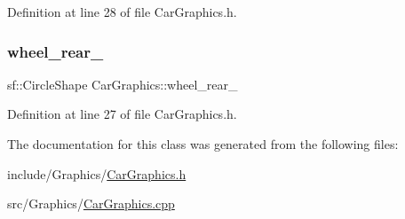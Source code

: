 Definition at line 28 of file Car\+Graphics.\+h.

\mbox{\label{classCarGraphics_a2a66d0c60b79f54a807a31afd76c4ad1}} 
\subsubsection{\texorpdfstring{wheel\+\_\+rear\+\_\+}{wheel\_rear\_}}
{\footnotesize\ttfamily sf\+::\+Circle\+Shape Car\+Graphics\+::wheel\+\_\+rear\+\_\+\hspace{0.3cm}{\ttfamily [private]}}



Definition at line 27 of file Car\+Graphics.\+h.



The documentation for this class was generated from the following files\+:\begin{DoxyCompactItemize}
\item 
include/\+Graphics/\hyperlink{CarGraphics_8h}{Car\+Graphics.\+h}\item 
src/\+Graphics/\hyperlink{CarGraphics_8cpp}{Car\+Graphics.\+cpp}\end{DoxyCompactItemize}

